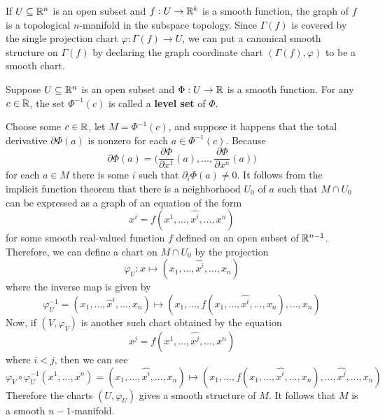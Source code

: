 \begin{example}
If $U\subseteq\mathbb{R}^n$ is an open subset and $f:U\to\mathbb{R}^k$ is a smooth function, the graph of $f$ is a topological $n$-manifold in the subspace topology. Since $\Gamma(f)$ is covered by the single projection chart $\varphi:\Gamma(f)\to U$, we can put a canonical smooth structure on $\Gamma(f)$ by declaring the graph coordinate chart $(\Gamma(f),\varphi)$ to be a smooth chart.
\end{example}
\begin{example}
Suppose $U\subseteq\mathbb{R}^n$ is an open subset and $\Phi:U\to\mathbb{R}$ is a smooth function. For any $c\in\mathbb{R}$, the set $\Phi^{-1}(c)$ is called a \textbf{level set} of $\Phi$.\par
Choose some $c\in\mathbb{R}$, let $M=\Phi^{-1}(c)$, and suppose it happens that the total derivative $\partial\Phi(a)$ is nonzero for each $a\in\Phi^{-1}(c)$. Because 
\[\partial\Phi(a)=\Big(\frac{\partial\Phi}{\partial x^1}(a),\dots,\frac{\partial\Phi}{\partial x^n}(a)\Big)\]
for each $a\in M$ there is some $i$ such that $\partial_i\Phi(a)\neq 0$. It follows from the implicit function theorem  that there is a neighborhood $U_0$ of $a$ such that $M\cap U_0$ can be expressed as a graph of an equation of the form
\[x^i=f(x^1,\dots,\widehat{x^i},\dots,x^n)\]
for some smooth real-valued function $f$ defined on an open subset of $\mathbb{R}^{n-1}$. Therefore, we can define a chart on $M\cap U_0$ by the projection
\[\varphi_U: x\mapsto(x_1,\dots,\widehat{x^i},\dots,x_n)\]
where the inverse map is given by \[\varphi_U^{-1}=(x_1,\dots,\widehat{x}^i,\dots,x_n)\mapsto(x_1,\dots,f(x_1,\dots,\widehat{x^i},\dots,x_n),\dots,x_n)\]
Now, if $(V,\varphi_V)$ is another such chart obtained by the equation
\[x^j=f(x^1,\dots,\widehat{x^j},\dots,x^n)\]
where $i<j$, then we can see
\[\varphi_V\circ\varphi_U^{-1}(x^1,\dots,x^n)=(x_1,\dots,\widehat{x^i},\dots,x_n)\mapsto(x_1,\dots,f(x_1,\dots,\widehat{x^i},\dots,x_n),\dots,\widehat{x^j},\dots,x_n)\]
Therefore the charts $(U,\varphi_U)$ gives a smooth structure of $M$. It follows that $M$ is a smooth $n-1$-manifold.
\end{example}

